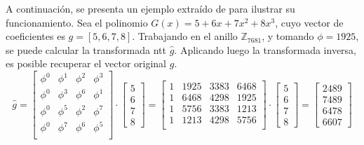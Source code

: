 A continuación, se presenta un ejemplo extraído de \cite{cryptoeprint:2024/585} para ilustrar su funcionamiento. Sea el polinomio \(G(x)=5+6x+7x^2+8x^3\), cuyo vector de coeficientes es \(g=[5,6,7,8]\). Trabajando en el anillo \(\mathbb{Z}_{7681}\), y tomando $\phi=1925$, se puede calcular la transformada \gls{ntt} \(\hat{g}\). Aplicando luego la transformada inversa, es posible recuperar el vector original \(g\).
\begin{equation}
	\hat{g}=\begin{bmatrix}
		\phi^0 & \phi^1 & \phi^2 & \phi^3\\
		\phi^0 & \phi^3 & \phi^6 & \phi^1\\
		\phi^0 & \phi^5 & \phi^2 & \phi^7\\
		\phi^0 & \phi^7 & \phi^6 & \phi^5\\
	\end{bmatrix} \cdot \begin{bmatrix}
	5\\
	6\\
	7\\
	8
	\end{bmatrix}=\begin{bmatrix}
	1 & 1925 & 3383 & 6468\\
	1 & 6468 & 4298 & 1925\\
	1 & 5756 & 3383 & 1213\\
	1 & 1213 & 4298 & 5756\\
	\end{bmatrix} \cdot \begin{bmatrix}
	5\\
	6\\
	7\\
	8 \end{bmatrix}= \begin{bmatrix}
	2489\\
	7489\\
	6478\\
	6607 \end{bmatrix}
\end{equation}

